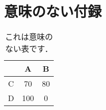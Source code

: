 \documentclass[dvipdfmx]{ampbt}
\begin{document}
\clearpage
{} %




\appendix

\section{意味のない付録}

\begin{table}[htbp]
  \caption{これは意味のない表です．}
  \centering
  \begin{tabular}{c|cc}
      &  A  &  B \\
    \hline
    C &  70 & 80 \\
    D & 100 &  0
  \end{tabular}
\end{table}

\fi
\ifoutputcover
\evenclearpage
\makecover                      %
\makespine[1]                   %
\makeinsidecover                %
\fi
\ifoutputabstractforsubmission
\makeabstractforsubmission      %
\fi
\end{document}
